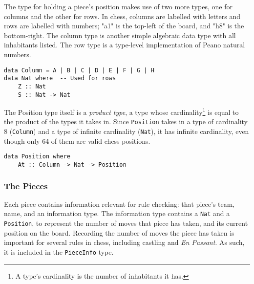 \documentclass[12pt, a4paper]{scrartcl}
\begin{document}
The type for holding a piece's position makes use of two more types, one for columns and the other for rows. In chess, columns are labelled with letters and rows are labelled with numbers; "a1" is the top-left of the board, and "h8" is the bottom-right. The column type is another simple algebraic data type with all inhabitants listed. The row type is a type-level implementation of Peano natural numbers.


\begin{lstlisting}
data Column = A | B | C | D | E | F | G | H
data Nat where  -- Used for rows
    Z :: Nat
    S :: Nat -> Nat
\end{lstlisting}

The Position type itself is a \emph{product type}, a type whose cardinality\footnote{A type's cardinality is the number of inhabitants it has.} is equal to the product of the types it takes in. Since \lstinline{Position} takes in a type of cardinality 8 (\lstinline{Column}) and a type of infinite cardinality (\lstinline{Nat}), it has infinite cardinality, even though only 64 of them are valid chess positions.


\begin{lstlisting}
data Position where
    At :: Column -> Nat -> Position
\end{lstlisting}

\subsubsection{The Pieces}

Each piece contains information relevant for rule checking: that piece's team, name, and an information type. The information type contains a \lstinline{Nat} and a \lstinline{Position}, to represent the number of moves that piece has taken, and its current position on the board. Recording the number of moves the piece has taken is important for several rules in chess, including castling and \textit{En Passant}. As such, it is included in the \lstinline{PieceInfo} type.
\end{document}
